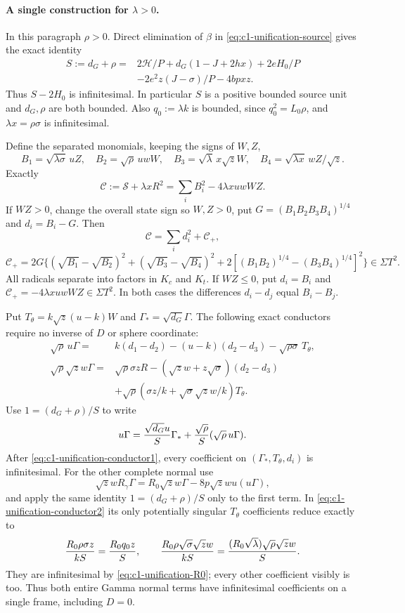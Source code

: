 \paragraph{A single construction for $\lambda>0$.}
In this paragraph $\rho>0$. Direct elimination of $\beta$ in
\eqref{eq:c1-unification-source} gives the exact identity
\begin{equation}\label{eq:c1-unification-S}
\begin{split}
 S:=d_G+\rho={}&2\mathcal H/P
 +d_G(1-J+2hx)+2eH_0/P\\
 &-2e^2z(J-\sigma)/P-4bpxz.
\end{split}
\end{equation}
Thus $S-2H_0$ is infinitesimal. In particular $S$ is a positive
bounded source unit and $d_G,\rho$ are both bounded. Also
$q_0:=\lambda k$ is bounded, since $q_0^2=L_0\rho$, and
$\lambda x=\rho\sigma$ is infinitesimal.

Define the separated monomials, keeping the signs of $W,Z$,
\[
 B_1=\sqrt{\lambda\sigma}\,uZ,\quad
 B_2=\sqrt\rho\,uwW,\quad
 B_3=\sqrt\lambda\,x\sqrt zW,\quad
 B_4=\sqrt{\lambda x}\,wZ/\sqrt z.
\]
Exactly
\[
 \mathscr C:=\mathscr S+\lambda xR^2
        =\sum_i B_i^2-4\lambda xuwWZ.
\]
If $WZ>0$, change the overall state sign so $W,Z>0$, put
$G=(B_1B_2B_3B_4)^{1/4}$ and $d_i=B_i-G$. Then
\[
 \mathscr C=\sum_i d_i^2+\mathscr C_+,
\]
\[
 \mathscr C_+=2G\{(\sqrt{B_1}-\sqrt{B_2})^2
 +(\sqrt{B_3}-\sqrt{B_4})^2
 +2[(B_1B_2)^{1/4}-(B_3B_4)^{1/4}]^2\}\in\Sigma T^2.
\]
All radicals separate into factors in $K_c$ and $K_t$. If $WZ\le0$,
put $d_i=B_i$ and $\mathscr C_+=-4\lambda xuwWZ\in\Sigma T^2$.
In both cases the differences $d_i-d_j$ equal $B_i-B_j$.

Put $T_\theta=k\sqrt z(u-k)W$ and $\Gamma_*=\sqrt{d_G}\Gamma$.
The following exact conductors require no inverse of $D$ or sphere
coordinate:
\begin{align}
 \sqrt\rho\,u\Gamma={}&k(d_1-d_2)-(u-k)(d_2-d_3)
                      -\sqrt{\rho\sigma}\,T_\theta,\label{eq:c1-unification-conductor1}\\
 \sqrt\rho\sqrt z w\Gamma={}&\sqrt\rho\sigma zR
 -(\sqrt z w+z\sqrt\sigma)(d_2-d_3)\nonumber\\
 &+\sqrt\rho(\sigma z/k+\sqrt\sigma\sqrt z w/k)T_\theta.
 \label{eq:c1-unification-conductor2}
\end{align}
Use $1=(d_G+\rho)/S$ to write
\[
 u\Gamma={\sqrt{d_G}u\over S}\Gamma_*
              +{\sqrt\rho\over S}(\sqrt\rho\,u\Gamma).
\]
After \eqref{eq:c1-unification-conductor1}, every coefficient on
$(\Gamma_*,T_\theta,d_i)$ is infinitesimal. For the other complete
normal use
\[
 \sqrt z wR_\gamma\Gamma=R_0\sqrt z w\Gamma
                              -8p\sqrt z wu(u\Gamma),
\]
and apply the same identity $1=(d_G+\rho)/S$ only to the first term.
In \eqref{eq:c1-unification-conductor2} its only potentially singular
$T_\theta$ coefficients reduce exactly to
\[
 {R_0\rho\sigma z\over kS}={R_0q_0z\over S},\qquad
 {R_0\rho\sqrt\sigma\sqrt z w\over kS}
       ={(R_0\sqrt\lambda)\sqrt\rho\sqrt z w\over S}.
\]
They are infinitesimal by \eqref{eq:c1-unification-R0}; every other
coefficient visibly is too. Thus both entire Gamma normal terms
have infinitesimal coefficients on a single frame, including $D=0$.

